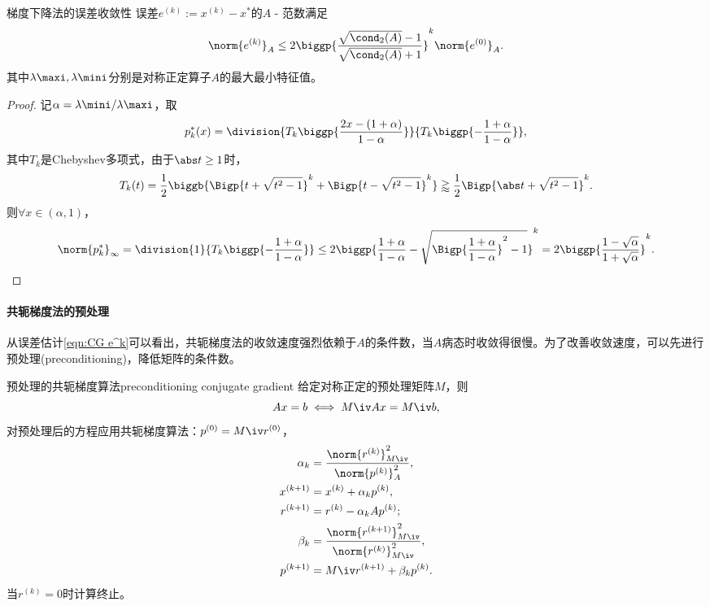 \begin{theorem}
    {梯度下降法的误差收敛性}{}
    误差$e^{(k)}:=x^{(k)}-x^*$的$A$ - 范数满足
    \begin{equation}
        \label{eqn:CG e^k}
        \norm{e^{(k)}}_A\leq 2\biggp{\frac{\sqrt{\cond_2(A)}-1}{\sqrt{\cond_2(A)}+1}}^k\norm{e^{(0)}}_A.
    \end{equation}
    其中$\lambda\maxi,\lambda\mini$分别是对称正定算子$A$的最大最小特征值。
\end{theorem}

\begin{proof}
    记$\alpha=\lambda\mini/\lambda\maxi$，取
    \[
        p_k^*(x)=\division{T_k\biggp{\frac{2x-(1+\alpha)}{1-\alpha}}}{T_k\biggp{-\frac{1+\alpha}{1-\alpha}}},
    \]
    其中$T_k$是Chebyshev多项式，由于$\abs t\geq 1$时，
    \[
        T_k(t)=\frac12\biggb{\Bigp{t+\sqrt{t^2-1}}^k+\Bigp{t-\sqrt{t^2-1}}^k}\gtrapprox \frac12\Bigp{\abs t+\sqrt{t^2-1}}^k.
    \]
    则$\forall x\in(\alpha,1)$，
    \[
        \norm{p_k^*}_\infty=\division{1}{T_k\biggp{-\frac{1+\alpha}{1-\alpha}}}\leq 2\biggp{\frac{1+\alpha}{1-\alpha}-\sqrt{\Bigp{\frac{1+\alpha}{1-\alpha}}^2-1}}^k=2\biggp{\frac{1-\sqrt\alpha}{1+\sqrt\alpha}}^k.
        \qedhere
    \]
\end{proof}

\paragraph{共轭梯度法的预处理}

从误差估计\eqref{eqn:CG e^k}可以看出，共轭梯度法的收敛速度强烈依赖于$A$的条件数，当$A$病态时收敛得很慢。为了改善收敛速度，可以先进行预处理(preconditioning)，降低矩阵的条件数。

\begin{theorem}
    {预处理的共轭梯度算法}{preconditioning conjugate gradient}
    给定对称正定的预处理矩阵$M$，则
    \[
        Ax=b\iff M\iv Ax=M\iv b,
    \]
    对预处理后的方程应用共轭梯度算法：$p^{(0)}=M\iv r^{(0)}$，
    \begin{subequations}
        \begin{align}
            \alpha_k&=\frac{\norm{r^{(k)}}_{M\iv}^2}{\norm{p^{(k)}}_A^2},\\
            x^{(k+1)}&=x^{(k)}+\alpha_kp^{(k)},\\
            r^{(k+1)}&=r^{(k)}-\alpha_kAp^{(k)};\\
            \beta_k&=\frac{\norm{r^{(k+1)}}_{M\iv}^2}{\norm{r^{(k)}}_{M\iv}^2},\\
            p^{(k+1)}&=M\iv r^{(k+1)}+\beta_kp^{(k)}.
        \end{align}
    \end{subequations}
    当$r^{(k)}=0$时计算终止。
\end{theorem}

